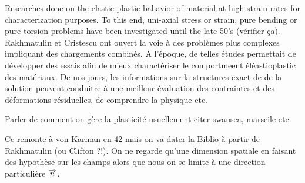 Researches done on the elastic-plastic bahavior of material at high strain rates for characterization purposes. To this end, uni-axial stress or strain, pure bending or pure torsion problems have been investigated until the late 50's (vérifier ça). Rakhmatulin et Cristescu ont ouvert la voie à des problèmes plus complexes impliquant des chargements combinés.
A l'époque, de telles études permettait de développer des essais afin de mieux charactériser le comportmeent éléastioplastic des matériaux. De nos jours, les informations sur la structures exact de de la solution peuvent conduitre à une meilleur évaluation des contraintes et des déformations résiduelles, de comprendre la physique etc.

Parler de comment on gère la plasticité usuellement citer swansea, marseile etc.

Ce remonte à von Karman en 42 mais on va dater la Biblio à partir de Rakhmatulin (ou Clifton ?!). On ne regarde qu'une dimension spatiale en faisant des hypothèse sur les champs alors que nous on se limite à une direction particulière ${\overrightarrow{n}}$.
